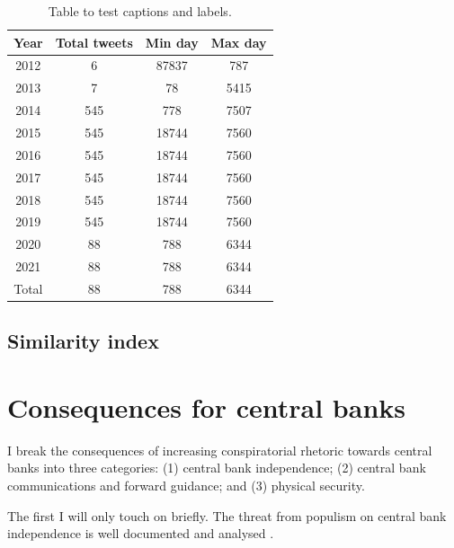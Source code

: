 \documentclass[11pt]{article}
\begin{document}
\begin{table}[h!]
\centering
\begin{tabular}{||c c c c||} 
 \hline
 Year & Total tweets & Min day & Max day \\ [0.5ex] 
 \hline\hline
 2012 & 6 & 87837 & 787 \\ 
 2013 & 7 & 78 & 5415 \\
 2014 & 545 & 778 & 7507 \\
 2015 & 545 & 18744 & 7560 \\
 2016 & 545 & 18744 & 7560 \\
 2017 & 545 & 18744 & 7560 \\
 2018 & 545 & 18744 & 7560 \\
 2019 & 545 & 18744 & 7560 \\
 2020 & 88 & 788 & 6344 \\ 
 2021 & 88 & 788 & 6344 \\ [0.5ex] 
 \hline\hline
 Total & 88 & 788 & 6344 \\ [1ex] 
 \hline
\end{tabular}
\caption{Table to test captions and labels.}
\label{table: basic hits}
\end{table}

\subsection{Similarity index} \label{Subsection: Similarity index}

\section{Consequences for central banks} \label{Section: Consequences for central banks}

I break the consequences of increasing conspiratorial rhetoric towards central banks into three categories: (1) central bank independence; (2) central bank communications and forward guidance; and (3) physical security.

The first I will only touch on briefly. The threat from populism on central bank independence is well documented and analysed \citep{goodhart2018populism, agur2018populism, gnan2020populism}. 

\clearpage

\end{document}
